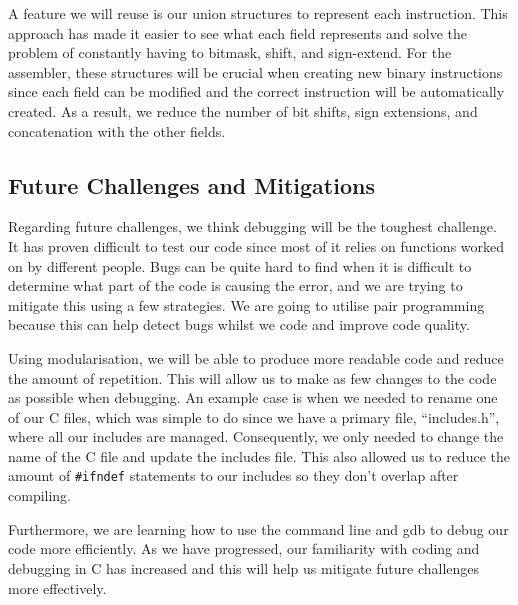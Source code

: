 \documentclass[11pt]{article}
\begin{document}
A feature we will reuse is our union structures to represent each instruction. This approach has made it easier to see what each field represents and solve the problem of constantly having to bitmask, shift, and sign-extend. For the assembler, these structures will be crucial when creating new binary instructions since each field can be modified and the correct instruction will be automatically created. As a result, we reduce the number of bit shifts, sign extensions, and concatenation with the other fields.


\subsection{Future Challenges and Mitigations}


Regarding future challenges, we think debugging will be the toughest challenge. It has proven difficult to test our code since most of it relies on functions worked on by different people. Bugs can be quite hard to find when it is difficult to determine what part of the code is causing the error, and we are trying to mitigate this using a few strategies. We are going to utilise pair programming because this can help detect bugs whilst we code and improve code quality.

Using modularisation, we will be able to produce more readable code and reduce the amount of repetition. This will allow us to make as few changes to the code as possible when debugging. An example case is when we needed to rename one of our C files, which was simple to do since we have a primary file, “includes.h”, where all our includes are managed. Consequently, we only needed to change the name of the C file and update the includes file. This also allowed us to reduce the amount of \verb|#ifndef| statements to our includes so they don’t overlap after compiling.

Furthermore, we are learning how to use the command line and gdb to debug our code more efficiently. As we have progressed, our familiarity with coding and debugging in C has increased and this will help us mitigate future challenges more effectively.
\end{document}

